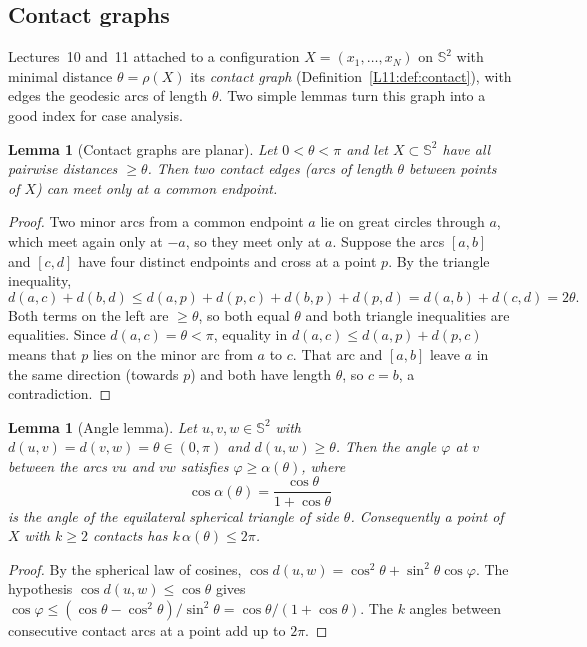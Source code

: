 \documentclass[11pt,openany]{book}
\theoremstyle{plain}
\newtheorem{lemma}[theorem]{Lemma}
\theoremstyle{definition}
\theoremstyle{remark}
\newcommand{\Sph}{\mathbb{S}}          %
\begin{document}
\subsection{Contact graphs}
Lectures~10 and~11 attached to a configuration $X=(x_1,\dots,x_N)$ on $\Sph^2$ with minimal distance
$\theta=\rho(X)$ its \emph{contact graph} (Definition~\ref{L11:def:contact}), with edges the geodesic arcs of
length $\theta$. Two simple lemmas turn this graph into a good index for case analysis.

\begin{lemma}[Contact graphs are planar]\label{COMP:lem:planar}
Let $0<\theta<\pi$ and let $X\subset\Sph^2$ have all pairwise distances $\ge\theta$. Then two contact
edges (arcs of length $\theta$ between points of $X$) can meet only at a common endpoint.
\end{lemma}

\begin{proof}
Two minor arcs from a common endpoint $a$ lie on great circles through $a$, which meet again only at
$-a$, so they meet only at $a$. Suppose the arcs $[a,b]$ and $[c,d]$ have four distinct endpoints and
cross at a point $p$. By the triangle inequality,
\[
  d(a,c)+d(b,d)\le d(a,p)+d(p,c)+d(b,p)+d(p,d)=d(a,b)+d(c,d)=2\theta .
\]
Both terms on the left are $\ge\theta$, so both equal $\theta$ and both triangle inequalities are
equalities. Since $d(a,c)=\theta<\pi$, equality in $d(a,c)\le d(a,p)+d(p,c)$ means that $p$ lies on the
minor arc from $a$ to $c$. That arc and $[a,b]$ leave $a$ in the same direction (towards $p$) and both
have length $\theta$, so $c=b$, a contradiction.
\end{proof}

\begin{lemma}[Angle lemma]\label{COMP:lem:angle}
Let $u,v,w\in\Sph^2$ with $d(u,v)=d(v,w)=\theta\in(0,\pi)$ and $d(u,w)\ge\theta$. Then the angle
$\varphi$ at $v$ between the arcs $vu$ and $vw$ satisfies $\varphi\ge\alpha(\theta)$, where
\[
  \cos\alpha(\theta)=\frac{\cos\theta}{1+\cos\theta}
\]
is the angle of the equilateral spherical triangle of side $\theta$. Consequently a point of $X$ with
$k\ge2$ contacts has $k\,\alpha(\theta)\le2\pi$.
\end{lemma}

\begin{proof}
By the spherical law of cosines, $\cos d(u,w)=\cos^2\theta+\sin^2\theta\cos\varphi$. The hypothesis
$\cos d(u,w)\le\cos\theta$ gives
$\cos\varphi\le(\cos\theta-\cos^2\theta)/\sin^2\theta=\cos\theta/(1+\cos\theta)$. The $k$ angles between
consecutive contact arcs at a point add up to $2\pi$.
\end{proof}
\end{document}
